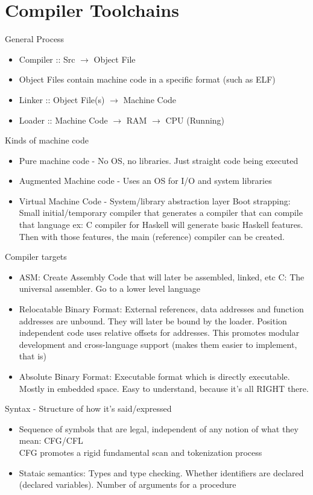 \documentclass[11pt]{article}
\begin{document}
\section{Compiler Toolchains}
    General Process
    \begin{itemize}
        \item Compiler :: Src $\rightarrow$ Object File
        \item Object Files contain machine code in a specific format (such as ELF)
        \item Linker :: Object File(s) $\rightarrow$ Machine Code
        \item Loader :: Machine Code $\rightarrow$ RAM $\rightarrow$ CPU (Running)
    \end{itemize}

    Kinds of machine code
    \begin{itemize}
        \item Pure machine code - No OS, no libraries. Just straight code being executed
        \item Augmented Machine code - Uses an OS for I/O and system libraries
        \item Virtual Machine Code - System/library abstraction layer
            Boot strapping: Small initial/temporary compiler that generates a compiler that can compile that language
            ex: C compiler for Haskell will generate basic Haskell features. Then with those features, the main (reference) compiler can be created.
    \end{itemize}
    Compiler targets
    \begin{itemize}
        \item ASM: Create Assembly Code that will later be assembled, linked, etc
            C: The universal assembler. Go to a lower level language
        \item Relocatable Binary Format: External references, data addresses
            and function addresses are unbound. They will later be bound by the
            loader. Position independent code uses relative offsets for addresses.
            This promotes modular development and cross-language support (makes
            them easier to implement, that is)
        \item Absolute Binary Format: Executable format which is directly executable.
            Mostly in embedded space. Easy to understand, because it's all RIGHT there.
    \end{itemize}

    Syntax - Structure of how it's said/expressed
    \begin{itemize}
        \item Sequence of symbols that are legal, independent of any notion of
            what they mean: CFG/CFL \\
            CFG promotes a rigid fundamental scan and tokenization process
        \item Stataic semantics: Types and type checking. Whether identifiers
            are declared (declared variables). Number of arguments for a procedure
    \end{itemize}
\end{document}
